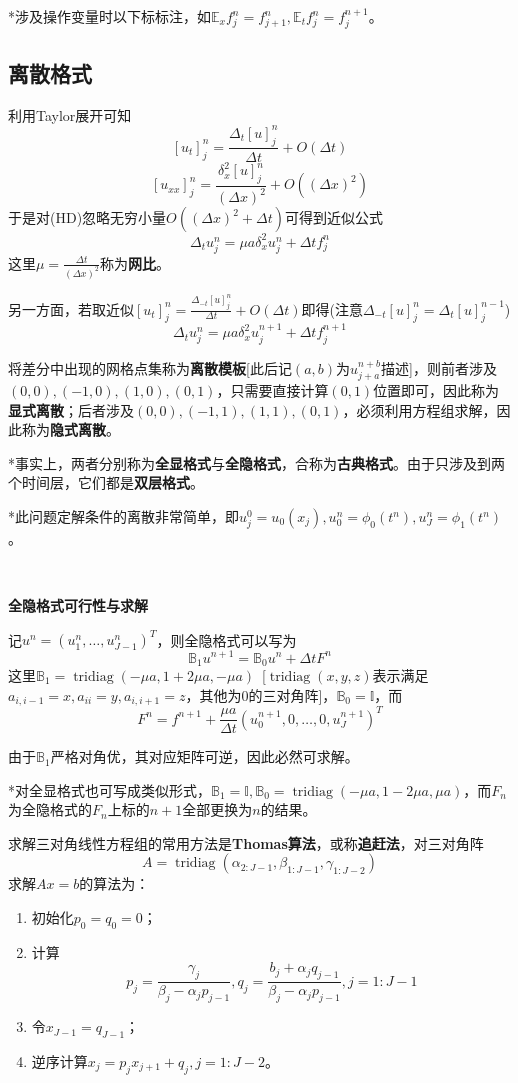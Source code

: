 \documentclass[a4paper,UTF8,fontset=windows]{ctexart}
\DeclareMathOperator{\tridiag}{tridiag}
\begin{document}
*涉及操作变量时以下标标注，如$\mathbb{E}_xf_j^n=f_{j+1}^n,\mathbb{E}_tf_j^n=f_j^{n+1}$。

\subsection{离散格式}
利用Taylor展开可知
$$[u_t]_j^n=\frac{\Delta_t[u]_j^n}{\Delta t}+O(\Delta t)$$
$$[u_{xx}]_j^n=\frac{\delta^2_x[u]_j^n}{(\Delta x)^2}+O((\Delta x)^2)$$
于是对(HD)忽略无穷小量$O((\Delta x)^2+\Delta t)$可得到近似公式
$$\Delta_tu_j^n=\mu a\delta_x^2u_j^n+\Delta tf_j^n$$
这里$\mu=\frac{\Delta t}{(\Delta x)^2}$称为\textbf{网比}。

另一方面，若取近似$[u_t]_j^n=\frac{\Delta_{-t}[u]_j^n}{\Delta t}+O(\Delta t)$即得(注意$\Delta_{-t}[u]_j^n=\Delta_t[u]_j^{n-1}$)
$$\Delta_tu_j^n=\mu a\delta_x^2u_j^{n+1}+\Delta tf_j^{n+1}$$

将差分中出现的网格点集称为\textbf{离散模板}[此后记$(a,b)$为$u_{j+a}^{n+b}$描述]，则前者涉及$(0,0),(-1,0),(1,0),(0,1)$，只需要直接计算$(0,1)$位置即可，因此称为\textbf{显式离散}；后者涉及$(0,0),(-1,1),(1,1),(0,1)$，必须利用方程组求解，因此称为\textbf{隐式离散}。

*事实上，两者分别称为\textbf{全显格式}与\textbf{全隐格式}，合称为\textbf{古典格式}。由于只涉及到两个时间层，它们都是\textbf{双层格式}。

*此问题定解条件的离散非常简单，即$u_j^0=u_0(x_j),u_0^n=\phi_0(t^n),u_J^n=\phi_1(t^n)$。

\

\textbf{全隐格式可行性与求解}

记$u^n=(u_1^n,\dots,u_{J-1}^n)^T$，则全隐格式可以写为
$$\mathbb{B}_1u^{n+1}=\mathbb{B}_0u^n+\Delta t F^n$$
这里$\mathbb{B}_1=\tridiag(-\mu a,1+2\mu a,-\mu a)$\ [$\tridiag(x,y,z)$表示满足$a_{i,i-1}=x,a_{ii}=y,a_{i,i+1}=z$，其他为0的三对角阵]，$\mathbb{B}_0=\mathbb{I}$，而
$$F^n=f^{n+1}+\frac{\mu a}{\Delta t}(u_0^{n+1},0,\dots,0,u_J^{n+1})^T$$

由于$\mathbb{B}_1$严格对角优，其对应矩阵可逆，因此必然可求解。

*对全显格式也可写成类似形式，$\mathbb{B}_1=\mathbb{I},\mathbb{B}_0=\tridiag(-\mu a,1-2\mu a,\mu a)$，而$F_n$为全隐格式的$F_n$上标的$n+1$全部更换为$n$的结果。

求解三对角线性方程组的常用方法是\textbf{Thomas算法}，或称\textbf{追赶法}，对三对角阵
$$A=\tridiag(\alpha_{2:J-1},\beta_{1:J-1},\gamma_{1:J-2})$$
求解$Ax=b$的算法为：
\begin{enumerate}
    \item 初始化$p_0=q_0=0$；
    \item 计算
    $$p_j=\frac{\gamma_j}{\beta_j-\alpha_jp_{j-1}},q_j=\frac{b_j+\alpha_jq_{j-1}}{\beta_j-\alpha_jp_{j-1}},j=1:J-1$$
    \item 令$x_{J-1}=q_{J-1}$；
    \item 逆序计算$x_j=p_jx_{j+1}+q_j,j=1:J-2$。
\end{enumerate}
\end{document}
